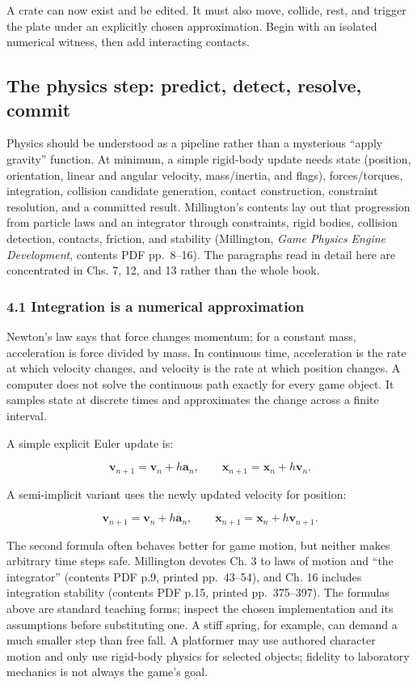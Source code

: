 A crate can now exist and be edited. It must also move, collide, rest, and trigger the plate under an explicitly chosen approximation. Begin with an isolated numerical witness, then add interacting contacts.

\subsection{The physics step: predict, detect, resolve, commit}\label{06-engine-ii-ch033-the-physics-step-predict-detect-resolve-commit}

Physics should be understood as a pipeline rather than a mysterious ``apply gravity'' function. At minimum, a simple rigid-body update needs state (position, orientation, linear and angular velocity, mass/inertia, and flags), forces/torques, integration, collision candidate generation, contact construction, constraint resolution, and a committed result. Millington's contents lay out that progression from particle laws and an integrator through constraints, rigid bodies, collision detection, contacts, friction, and stability (Millington, \emph{Game Physics Engine Development}, contents PDF pp.~8--16). The paragraphs read in detail here are concentrated in Chs. 7, 12, and 13 rather than the whole book.

\subsubsection{4.1 Integration is a numerical approximation}\label{06-engine-ii-ch033-integration-is-a-numerical-approximation}

Newton's law says that force changes momentum; for a constant mass, acceleration is force divided by mass. In continuous time, acceleration is the rate at which velocity changes, and velocity is the rate at which position changes. A computer does not solve the continuous path exactly for every game object. It samples state at discrete times and approximates the change across a finite interval.

A simple explicit Euler update is:

\[
\mathbf{v}_{n+1}=\mathbf{v}_n+h\mathbf{a}_n,
\qquad
\mathbf{x}_{n+1}=\mathbf{x}_n+h\mathbf{v}_n.
\]

A semi-implicit variant uses the newly updated velocity for position:

\[
\mathbf{v}_{n+1}=\mathbf{v}_n+h\mathbf{a}_n,
\qquad
\mathbf{x}_{n+1}=\mathbf{x}_n+h\mathbf{v}_{n+1}.
\]

The second formula often behaves better for game motion, but neither makes arbitrary time steps safe. Millington devotes Ch. 3 to laws of motion and ``the integrator'' (contents PDF p.9, printed pp.~43--54), and Ch. 16 includes integration stability (contents PDF p.15, printed pp.~375--397). The formulas above are standard teaching forms; inspect the chosen implementation and its assumptions before substituting one. A stiff spring, for example, can demand a much smaller step than free fall. A platformer may use authored character motion and only use rigid-body physics for selected objects; fidelity to laboratory mechanics is not always the game's goal.


